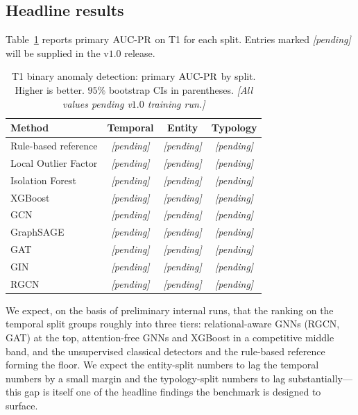 \subsection{Headline results}
\label{sec:evaluation:headline}

Table~\ref{tab:eval:headline} reports primary $\operatorname{AUC\text{-}PR}$ on T1 for
each split.  Entries marked \textit{[pending]} will be supplied
in the v$1.0$ release.

\begin{table}[H]
  \centering
  \caption{T1 binary anomaly detection: primary $\operatorname{AUC\text{-}PR}$ by split.
    Higher is better.  $95\%$ bootstrap CIs in parentheses.
    \textit{[All values pending v$1.0$ training run.]}}
  \label{tab:eval:headline}
  \small
  \begin{tabular}{lccc}
    \toprule
    \textbf{Method} & \textbf{Temporal} & \textbf{Entity} &
      \textbf{Typology}\\
    \midrule
    Rule-based reference   & \textit{[pending]} & \textit{[pending]} & \textit{[pending]}\\
    Local Outlier Factor   & \textit{[pending]} & \textit{[pending]} & \textit{[pending]}\\
    Isolation Forest       & \textit{[pending]} & \textit{[pending]} & \textit{[pending]}\\
    XGBoost                & \textit{[pending]} & \textit{[pending]} & \textit{[pending]}\\
    \midrule
    GCN~\citep{kipf2017semi}              & \textit{[pending]} & \textit{[pending]} & \textit{[pending]}\\
    GraphSAGE~\citep{hamilton2017inductive} & \textit{[pending]} & \textit{[pending]} & \textit{[pending]}\\
    GAT~\citep{velickovic2018graph}        & \textit{[pending]} & \textit{[pending]} & \textit{[pending]}\\
    GIN~\citep{xu2019gin}                 & \textit{[pending]} & \textit{[pending]} & \textit{[pending]}\\
    RGCN~\citep{schlichtkrull2018rgcn}    & \textit{[pending]} & \textit{[pending]} & \textit{[pending]}\\
    \bottomrule
  \end{tabular}
\end{table}

We expect, on the basis of preliminary internal runs, that the
ranking on the temporal split groups roughly into three tiers:
relational-aware GNNs (RGCN, GAT) at the top, attention-free GNNs
and XGBoost in a competitive middle band, and the unsupervised
classical detectors and the rule-based reference forming the
floor.  We expect the entity-split numbers to lag the temporal
numbers by a small margin and the typology-split numbers to lag
substantially---this gap is itself one of the headline findings
the benchmark is designed to surface.

